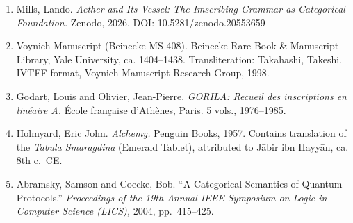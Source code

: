\begin{enumerate}
\def\labelenumi{\arabic{enumi}.}
\item
  Mills, Lando. \emph{Aether and Its Vessel: The Imscribing Grammar as
  Categorical Foundation.} Zenodo, 2026. DOI: 10.5281/zenodo.20553659
\item
  Voynich Manuscript (Beinecke MS 408). Beinecke Rare Book \& Manuscript
  Library, Yale University, ca. 1404--1438. Transliteration: Takahashi,
  Takeshi. IVTFF format, Voynich Manuscript Research Group, 1998.
\item
  Godart, Louis and Olivier, Jean-Pierre. \emph{GORILA: Recueil des
  inscriptions en linéaire A.} École française d'Athènes, Paris. 5
  vols., 1976--1985.
\item
  Holmyard, Eric John. \emph{Alchemy.} Penguin Books, 1957. Contains
  translation of the \emph{Tabula Smaragdina} (Emerald Tablet),
  attributed to Jābir ibn Hayyān, ca. 8th c.~CE.
\item
  Abramsky, Samson and Coecke, Bob. ``A Categorical Semantics of Quantum
  Protocols.'' \emph{Proceedings of the 19th Annual IEEE Symposium on
  Logic in Computer Science (LICS),} 2004, pp.~415--425.
\end{enumerate}
